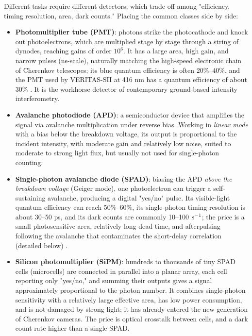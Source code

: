 Different tasks require different detectors, which trade off among "efficiency, timing resolution, area, dark counts." Placing the common classes side by side:

\begin{itemize}
  \item \textbf{Photomultiplier tube (PMT)}: photons strike the photocathode and knock out photoelectrons, which are multiplied stage by stage through a string of dynodes, reaching gains of order $10^6$. It has a large area, high gain, and narrow pulses (ns-scale), naturally matching the high-speed electronic chain of Cherenkov telescopes; its blue quantum efficiency is often $20\%$--$40\%$, and the PMT used by VERITAS-SII at 416 nm has a quantum efficiency of about $30\%$ \citep{2020NatAs...4.1164A,2024MNRAS.529.4387A}. It is the workhorse detector of contemporary ground-based intensity interferometry.
  \item \textbf{Avalanche photodiode (APD)}: a semiconductor device that amplifies the signal via avalanche multiplication under reverse bias. Working in \emph{linear mode} with a bias below the breakdown voltage, its output is proportional to the incident intensity, with moderate gain and relatively low noise, suited to moderate to strong light flux, but usually not used for single-photon counting.
  \item \textbf{Single-photon avalanche diode (SPAD)}: biasing the APD \emph{above the breakdown voltage} (Geiger mode), one photoelectron can trigger a self-sustaining avalanche, producing a digital "yes/no" pulse. Its visible-light quantum efficiency can reach $50\%$--$60\%$, its single-photon timing resolution is about 30--50 ps, and its dark counts are commonly 10--100 ${\rm s}^{-1}$; the price is a small photosensitive area, relatively long dead time, and afterpulsing following the avalanche that contaminates the short-delay correlation (detailed below) \citep{1996ApOpt..35.1956C,2009JMOp...56..261B,2009A&A...508..531N,2015SPIE.9504E..0CZ}.
  \item \textbf{Silicon photomultiplier (SiPM)}: hundreds to thousands of tiny SPAD cells (microcells) are connected in parallel into a planar array, each cell reporting only "yes/no," and summing their outputs gives a signal approximately proportional to the photon number. It combines single-photon sensitivity with a relatively large effective area, has low power consumption, and is not damaged by strong light; it has already entered the new generation of Cherenkov cameras. The price is optical crosstalk between cells, and a dark count rate higher than a single SPAD.

\end{itemize}
